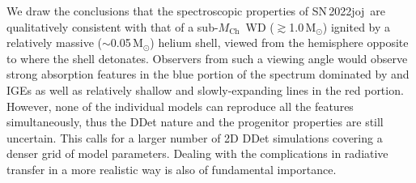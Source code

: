 \documentclass[twocolumn]{aastex631}
\newcommand{\sn}{SN\,2022joj}
\newcommand{\Mch}{$M_\mathrm{Ch}$}
\begin{document}
\begin{CJK*}{UTF8}{gbsn}
We draw the conclusions that the spectroscopic properties of \sn\ are qualitatively consistent with that of a sub-\Mch\ WD ($\gtrsim$1.0\,$\mathrm{M_\odot}$) ignited by a relatively massive ($\sim$0.05$\,\mathrm{M_\odot}$) helium shell, viewed from the hemisphere opposite to where the shell detonates. Observers from such a viewing angle would observe strong absorption features in the blue portion of the spectrum dominated by  and IGEs as well as relatively shallow and slowly-expanding  lines in the red portion. However, none of the individual models can reproduce all the features simultaneously, thus the DDet nature and the progenitor properties are still uncertain. This calls for a larger number of 2D DDet simulations covering a denser grid of model parameters. Dealing with the complications in radiative transfer \citep[e.g., non-LTE effects; see][]{Shen_NLTE_2021} in a more realistic way is also of fundamental importance.


\end{CJK*}
\end{document}
